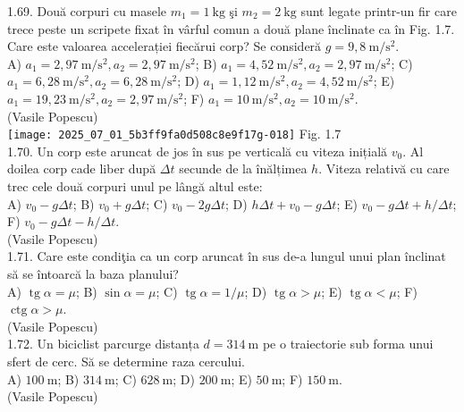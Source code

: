 1.69. Două corpuri cu masele $m_{1}=1 \mathrm{~kg}$ şi $m_{2}=2 \mathrm{~kg}$ sunt legate printr-un fir care trece peste un scripete fixat în vârful comun a două plane înclinate ca în Fig. 1.7. Care este valoarea accelerației fiecărui corp? Se consideră $g=9,8 \mathrm{~m} / \mathrm{s}^{2}$.\\ A) $a_{1}=2,97 \mathrm{~m} / \mathrm{s}^{2}, a_{2}=2,97 \mathrm{~m} / \mathrm{s}^{2}$; B) $a_{1}=4,52 \mathrm{~m} / \mathrm{s}^{2}, a_{2}=2,97 \mathrm{~m} / \mathrm{s}^{2}$; C) $a_{1}=6,28 \mathrm{~m} / \mathrm{s}^{2}, a_{2}=6,28 \mathrm{~m} / \mathrm{s}^{2}$; D) $a_{1}=1,12 \mathrm{~m} / \mathrm{s}^{2}, a_{2}=4,52 \mathrm{~m} / \mathrm{s}^{2}$; E) $a_{1}=19,23 \mathrm{~m} / \mathrm{s}^{2}, a_{2}=2,97 \mathrm{~m} / \mathrm{s}^{2}$; F) $a_{1}=10 \mathrm{~m} / \mathrm{s}^{2}, a_{2}=10 \mathrm{~m} / \mathrm{s}^{2}$.\\ (Vasile Popescu)\\ \texttt{[image: 2025\_07\_01\_5b3ff9fa0d508c8e9f17g-018]} Fig. 1.7\\

1.70. Un corp este aruncat de jos în sus pe verticală cu viteza inițială $v_{0}$. Al doilea corp cade liber după $\Delta t$ secunde de la înălțimea $h$. Viteza relativă cu care trec cele două corpuri unul pe lângă altul este:\\ A) $v_{0}-g \Delta t$; B) $v_{0}+g \Delta t$; C) $v_{0}-2 g \Delta t$; D) $h \Delta t+v_{0}-g \Delta t$; E) $v_{0}-g \Delta t+h / \Delta t$; F) $v_{0}-g \Delta t-h / \Delta t$.\\ (Vasile Popescu)\\

1.71. Care este condiţia ca un corp aruncat în sus de-a lungul unui plan înclinat să se întoarcă la baza planului?\\ A) $\operatorname{tg} \alpha=\mu$; B) $\sin \alpha=\mu$; C) $\operatorname{tg} \alpha=1 / \mu$; D) $\operatorname{tg} \alpha>\mu$; E) $\operatorname{tg} \alpha<\mu$; F) $\operatorname{ctg} \alpha>\mu$.\\ (Vasile Popescu)\\

1.72. Un biciclist parcurge distanța $d=314 \mathrm{~m}$ pe o traiectorie sub forma unui sfert de cerc. Să se determine raza cercului.\\ A) $100 \mathrm{~m}$; B) $314 \mathrm{~m}$; C) $628 \mathrm{~m}$; D) $200 \mathrm{~m}$; E) $50 \mathrm{~m}$; F) $150 \mathrm{~m}$.\\ (Vasile Popescu)\\


